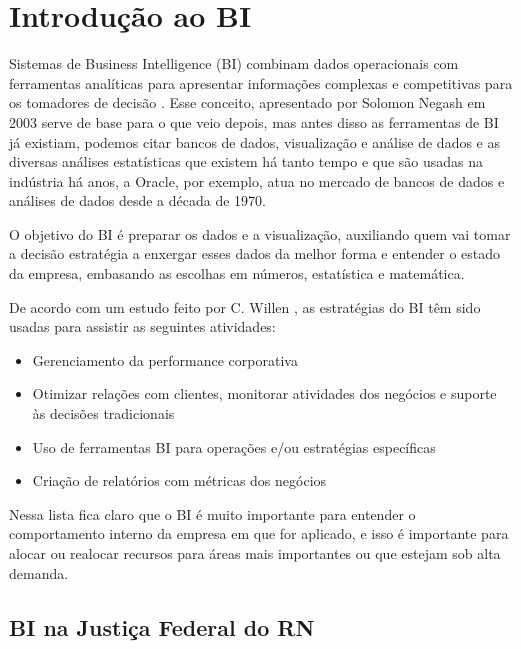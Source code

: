 \chapter{Introdução ao BI}\label{cap_trabalho_academico}


Sistemas de Business Intelligence (BI) combinam dados operacionais com ferramentas analíticas para apresentar informações complexas e competitivas para os tomadores de decisão \cite{negash1}. Esse conceito, apresentado por Solomon Negash em 2003 serve de base para o que veio depois, mas antes disso as ferramentas de BI já existiam, podemos citar bancos de dados, visualização e análise de dados e as diversas análises estatísticas que existem há tanto tempo e que são usadas na indústria há anos, a Oracle, por exemplo, atua no mercado de bancos de dados e análises de dados desde a década de 1970. 

O objetivo do BI é preparar os dados e a visualização, auxiliando quem vai tomar a decisão estratégia a enxergar esses dados da melhor forma e entender o estado da empresa, embasando as escolhas em números, estatística e matemática. 

De acordo com um estudo feito por C. Willen \cite{willen1}, as estratégias do BI têm sido usadas para assistir as seguintes atividades:

\begin{itemize}
	\item Gerenciamento da performance corporativa
	\item Otimizar relações com clientes, monitorar atividades dos negócios e suporte às decisões tradicionais
	\item Uso de ferramentas BI para operações e/ou estratégias específicas
	\item Criação de relatórios com métricas dos negócios
\end{itemize}

Nessa lista fica claro que o BI é muito importante para entender o comportamento interno da empresa em que for aplicado, e isso é importante para alocar ou realocar recursos para áreas mais importantes ou que estejam sob alta demanda.

\section{BI na Justiça Federal do RN}

